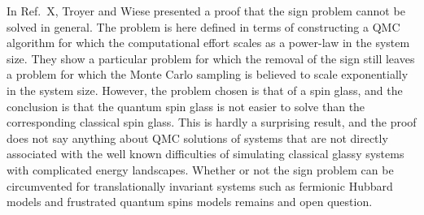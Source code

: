 \documentclass[range]{ar2e}
\begin{document}
In Ref.~X, Troyer and Wiese presented a proof that the sign problem cannot be solved in general. The problem is here
defined in terms of constructing a QMC algorithm for which the computational effort scales as a power-law in the system
size. They show a particular problem for which the removal of the sign still leaves a problem for which the Monte Carlo
sampling is believed to scale exponentially in the system size. However, the problem chosen is that of a spin glass, and 
the conclusion is that the quantum spin glass is not easier to solve than the corresponding classical spin glass. This is 
hardly a surprising result, and the proof does not say anything about QMC solutions of systems that are not directly
associated with the well known difficulties of simulating classical glassy systems with complicated energy landscapes. 
Whether or not the sign problem can be circumvented for translationally invariant systems such as fermionic Hubbard models 
and frustrated quantum spins models remains and open question.




%
\end{document}
